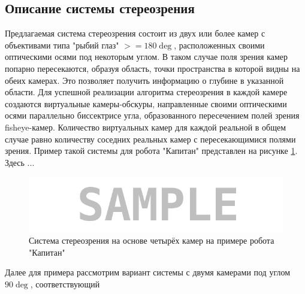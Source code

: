 \subsection{Описание системы стереозрения}

Предлагаемая система стереозрения состоит из двух или более камер с объективами типа "рыбий глаз" $>=180\deg$,
расположенных своими оптическими осями под некоторым углом. В таком случае поля зрения камер попарно пересекаются, 
образуя  область, точки пространства в которой видны на обеих камерах. Это позволяет получить информацию о 
глубине в указанной области.
Для успешной реализации алгоритма стереозрения в каждой камере создаются виртуальные камеры-обскуры, направленные 
своими оптическими осями параллельно биссектрисе угла, образованного пересечением полей зрения fisheye-камер. Количество
 виртуальных камер для каждой реальной в общем случае равно количеству соседних реальных камер с пересекающимися полями 
 зрения. Пример такой системы для робота "Капитан" представлен на рисунке \ref{pic:4cam_system}. Здесь ... %
 \begin{figure}[H]
    \begin{center}
        \includegraphics[scale=0.5]{pics/sample.png}                                                                                            %
        \caption{Система стереозрения на основе четырёх камер на примере робота "Капитан"}
        \label{pic:4cam_system}
    \end{center}
\end{figure}
 Далее для примера рассмотрим вариант системы с двумя камерами под углом $90\deg$, соответствующий  